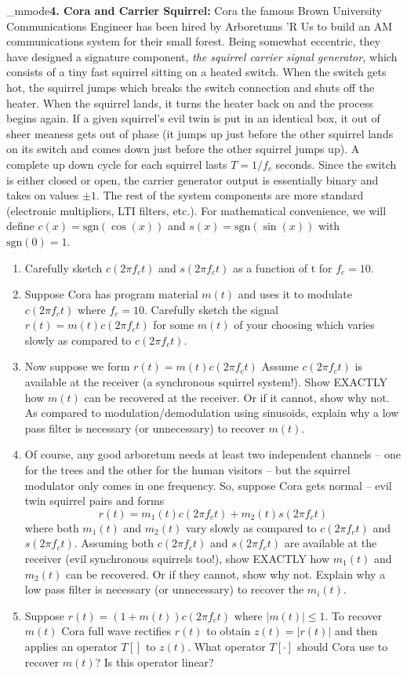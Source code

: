 \documentclass[12pt]{article}
\newcommand*{\tbf}[1]{\if_mmode\mathbf{#1}\else\textbf{#1}\fi}
\begin{document}
\pagebreak
\tbf{4. Cora and Carrier Squirrel:}
Cora the famous Brown University Communications Engineer has been hired by Arboretums 'R Us to build an AM communications system for their small forest. Being somewhat eccentric, they have designed a signature component,\emph{ the squirrel carrier signal generator,}
which consists of a tiny fast squirrel sitting on a heated switch. When the switch gets hot, the squirrel jumps which breaks the switch connection and shuts off the heater. When the squirrel lands, it turns the heater back on and the process begins again. If a given squirrel's
evil twin is put in an identical box, it out of sheer meaness gets out of phase (it jumps up just before the other squirrel lands on its switch and comes down just before the other squirrel jumps up).
A complete up down cycle for each squirrel lasts $T = 1/f_c$ seconds. Since the switch is either closed or open, the carrier generator output is essentially binary and takes on values $\pm 1$. The rest of the system components are more standard (electronic multipliers, LTI filters,
etc.).
For mathematical convenience, we will define $c(x) = \text{sgn} (\cos(x))$ and $s(x) = \text{sgn} (\sin(x))$
with $\text{sgn} (0) = 1$.

\begin{enumerate}
\item Carefully sketch $c(2\pi f_ct)$ and $s(2\pi f_ct)$ as a function of t for $f_c = 10$.

\item Suppose Cora has program material $m(t)$ and uses it to modulate $c(2\pi f_ct)$ where $f_c = 10$. Carefully sketch the signal $r(t) = m(t)c(2\pi f_ct)$ for some $m(t)$ of your choosing which varies slowly as compared to $c(2\pi f_ct)$.

\item Now suppose we form $r(t) = m(t)c(2\pi f_ct)$ Assume $c(2\pi f_ct)$ is available at the receiver (a synchronous squirrel system!). Show EXACTLY how $m(t)$ can be recovered at the receiver. Or if it cannot, show why not. As compared to modulation/demodulation using sinusoids, explain why a low pass filter is necessary (or unnecessary) to recover $m(t)$.

\item Of course, any good arboretum needs at least two independent channels -- one for the trees and the other for the human visitors – but the squirrel modulator only comes
in one frequency. So, suppose Cora gets normal – evil twin squirrel pairs and forms
\[r(t) = m_1(t)c(2\pi f_ct) + m_2(t)s(2\pi f_ct) \]
where both $m_1(t)$ and $m_2(t)$ vary slowly as
compared to $c(2\pi f_ct)$ and $s(2\pi f_ct)$. Assuming both $c(2\pi f_ct)$ and $s(2\pi f_ct)$ are available
at the receiver (evil synchronous squirrels too!), show EXACTLY how $m_1(t)$ and $m_2(t)$
can be recovered. Or if they cannot, show why not.
Explain why a low pass filter is necessary (or unnecessary) to recover the $m_i(t)$.
\item Suppose $r(t) = (1 + m(t))c(2\pi f_ct)$ where $|m(t)| \leq 1$. To recover $m(t)$ Cora full wave rectifies $r(t)$ to obtain $z(t) = |r(t)|$ and then applies an operator $T []$ to $z(t)$. What operator $T [\cdot]$ should Cora use to recover $m(t)$? Is this operator linear?
\end{enumerate}
\end{document}
